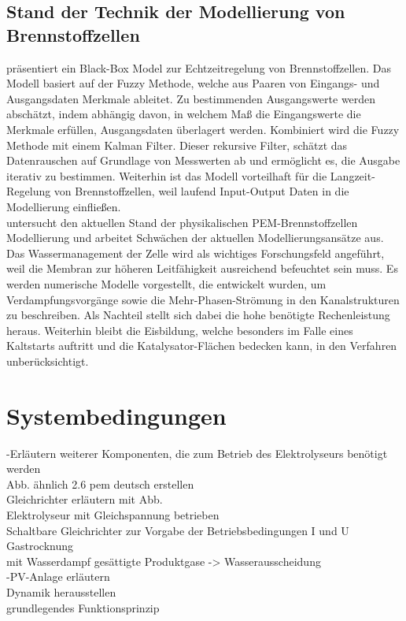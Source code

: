 \subsection{Stand der Technik der Modellierung von Brennstoffzellen}
\cite{barragan_iterative_2020} präsentiert ein Black-Box Model zur Echtzeitregelung von Brennstoffzellen. Das Modell basiert auf der Fuzzy Methode, welche aus Paaren von Eingangs- und Ausgangsdaten Merkmale ableitet. Zu bestimmenden Ausgangswerte werden abschätzt, indem abhängig davon, in welchem Maß die Eingangswerte die Merkmale erfüllen, Ausgangsdaten überlagert werden. Kombiniert wird die Fuzzy Methode mit einem Kalman Filter. Dieser rekursive Filter, schätzt das Datenrauschen auf Grundlage von Messwerten ab und ermöglicht es, die Ausgabe iterativ zu bestimmen. Weiterhin ist das Modell vorteilhaft für die Langzeit-Regelung von Brennstoffzellen, weil laufend Input-Output Daten in die Modellierung einfließen.\\

\citet{jiao - Challenges and opportunities in modelling of proton exchangemembrane fuel cells (PEMFC)} untersucht den aktuellen Stand der physikalischen PEM-Brennstoffzellen Modellierung und arbeitet Schwächen der aktuellen Modellierungsansätze aus. Das Wassermanagement der Zelle wird als wichtiges Forschungsfeld angeführt, weil die Membran zur höheren Leitfähigkeit ausreichend befeuchtet sein muss. Es werden numerische Modelle vorgestellt, die entwickelt wurden, um Verdampfungsvorgänge sowie die Mehr-Phasen-Strömung in den Kanalstrukturen zu beschreiben. Als Nachteil stellt sich dabei die hohe benötigte Rechenleistung heraus. Weiterhin bleibt die Eisbildung, welche besonders im Falle eines Kaltstarts auftritt und die Katalysator-Flächen bedecken kann, in den Verfahren unberücksichtigt.\\
\section{Systembedingungen}
-Erläutern weiterer Komponenten, die zum Betrieb des Elektrolyseurs benötigt werden\\

Abb. ähnlich 2.6 pem deutsch erstellen\\

Gleichrichter erläutern mit Abb.\\
Elektrolyseur mit Gleichspannung betrieben\\
Schaltbare Gleichrichter zur Vorgabe der Betriebsbedingungen I und U\\

Gastrocknung\\
mit Wasserdampf gesättigte Produktgase -> Wasserausscheidung\\

-PV-Anlage erläutern\\
Dynamik herausstellen\\
grundlegendes Funktionsprinzip\\




